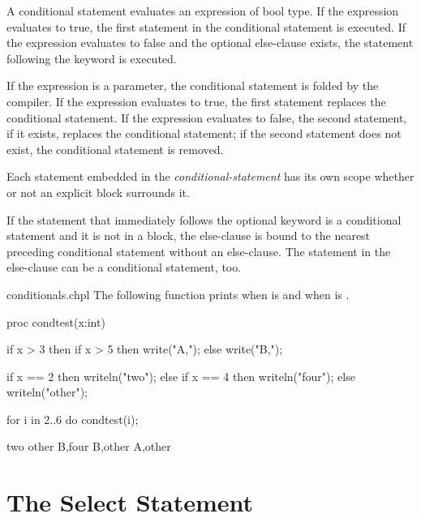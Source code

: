 A conditional statement evaluates an expression of bool type. If the
expression evaluates to true, the first statement in the conditional
statement is executed.  If the expression evaluates to false and the
optional else-clause exists, the statement following the
 keyword is executed.

If the expression is a parameter, the conditional statement is folded
by the compiler. If the expression evaluates to true, the first
statement replaces the conditional statement. If the expression
evaluates to false, the second statement, if it exists, replaces the
conditional statement; if the second statement does not exist, the
conditional statement is removed.

Each statement embedded in the {\em conditional-statement} has its own
scope whether or not an explicit block surrounds it.

If the statement that immediately follows the optional 
keyword is a conditional statement and it is not in a block, the
else-clause is bound to the nearest preceding conditional statement
without an else-clause.
The statement in the else-clause can be a conditional statement, too.

\begin{chapelexample}{conditionals.chpl}
The following function prints  when  is 
and  when  is .
\begin{chapel}
proc condtest(x:int) {
  if x > 3 then
    if x > 5 then
      write("A,");
    else
      write("B,");

  if x == 2 then
    writeln("two");
  else if x == 4 then
    writeln("four");
  else
    writeln("other");
}
\end{chapel}
\begin{chapelpost}
for i in 2..6 do condtest(i);
\end{chapelpost}
\begin{chapeloutput}
two
other
B,four
B,other
A,other
\end{chapeloutput}
\end{chapelexample}

\section{The Select Statement}
\label{The_Select_Statement}

